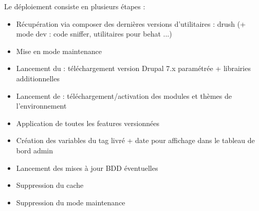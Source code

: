 \documentclass[a4paper,11pt,french]{rtdsphinxmanual}
\begin{document}
Le déploiement consiste en plusieurs étapes :
\begin{itemize}
\item {} 
Récupération via composer des dernières versions d'utilitaires : drush (+ mode dev : code sniffer, utilitaires pour behat ...)

\item {} 
Mise en mode maintenance

\item {} 
Lancement du  : téléchargement version Drupal 7.x paramétrée + librairies additionnelles

\item {} 
Lancement de  : téléchargement/activation des modules et thèmes de l'environnement

\item {} 
Application de toutes les features versionnées

\item {} 
Création des variables du tag livré + date pour affichage dans le tableau de bord admin

\item {} 
Lancement des mises à jour BDD éventuelles

\item {} 
Suppression du  cache

\item {} 
Suppression du mode maintenance

\end{itemize}



\renewcommand{\indexname}{Index}
\printindex
\end{document}
